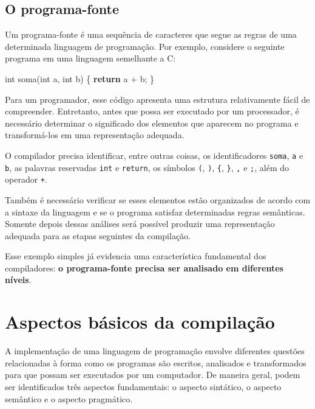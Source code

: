 \documentclass[
  brazilian,
  letterpaper,
]{book}
\newenvironment{Shaded}{\begin{snugshade}}{\end{snugshade}}
\newcommand{\ControlFlowTok}[1]{\textcolor[rgb]{0.00,0.23,0.31}{\textbf{#1}}}
\newcommand{\DataTypeTok}[1]{\textcolor[rgb]{0.68,0.00,0.00}{#1}}
\newcommand{\NormalTok}[1]{\textcolor[rgb]{0.00,0.23,0.31}{#1}}
\newcommand{\OperatorTok}[1]{\textcolor[rgb]{0.37,0.37,0.37}{#1}}
\theoremstyle{plain}
\theoremstyle{definition}
\theoremstyle{remark}
\begin{document}
\subsection{O programa-fonte}\label{o-programa-fonte}

Um programa-fonte é uma sequência de caracteres que segue as regras de
uma determinada linguagem de programação. Por exemplo, considere o
seguinte programa em uma linguagem semelhante a C:

\begin{Shaded}
\begin{Highlighting}[]
\DataTypeTok{int}\NormalTok{ soma}\OperatorTok{(}\DataTypeTok{int}\NormalTok{ a}\OperatorTok{,} \DataTypeTok{int}\NormalTok{ b}\OperatorTok{)} \OperatorTok{\{}
    \ControlFlowTok{return}\NormalTok{ a }\OperatorTok{+}\NormalTok{ b}\OperatorTok{;}
\OperatorTok{\}}
\end{Highlighting}
\end{Shaded}

Para um programador, esse código apresenta uma estrutura relativamente
fácil de compreender. Entretanto, antes que possa ser executado por um
processador, é necessário determinar o significado dos elementos que
aparecem no programa e transformá-los em uma representação adequada.

O compilador precisa identificar, entre outras coisas, os
identificadores \texttt{soma}, \texttt{a} e \texttt{b}, as palavras
reservadas \texttt{int} e \texttt{return}, os símbolos \texttt{(},
\texttt{)}, \texttt{\{}, \texttt{\}}, \texttt{,} e \texttt{;}, além do
operador \texttt{+}.

Também é necessário verificar se esses elementos estão organizados de
acordo com a sintaxe da linguagem e se o programa satisfaz determinadas
regras semânticas. Somente depois dessas análises será possível produzir
uma representação adequada para as etapas seguintes da compilação.

Esse exemplo simples já evidencia uma característica fundamental dos
compiladores: \textbf{o programa-fonte precisa ser analisado em
diferentes níveis}.

\section{Aspectos básicos da
compilação}\label{aspectos-buxe1sicos-da-compilauxe7uxe3o}

A implementação de uma linguagem de programação envolve diferentes
questões relacionadas à forma como os programas são escritos, analisados
e transformados para que possam ser executados por um computador. De
maneira geral, podem ser identificados três aspectos fundamentais: o
aspecto sintático, o aspecto semântico e o aspecto pragmático.
\end{document}
